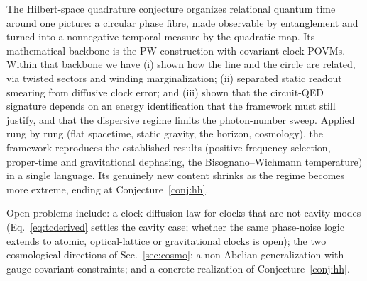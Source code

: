 \documentclass[aps,prd,onecolumn,notitlepage,10pt,amsmath,amssymb,amsfonts,nofootinbib]{revtex4-2}
\theoremstyle{definition}
\theoremstyle{remark}
\begin{document}
The Hilbert-space quadrature conjecture organizes relational quantum time around one picture: a circular phase fibre, made observable by entanglement and turned into a nonnegative temporal measure by the quadratic map. Its mathematical backbone is the PW construction with covariant clock POVMs. Within that backbone we have (i) shown how the line and the circle are related, via twisted sectors and winding marginalization; (ii) separated static readout smearing from diffusive clock error; and (iii) shown that the circuit-QED signature depends on an energy identification that the framework must still justify, and that the dispersive regime limits the photon-number sweep. Applied rung by rung (flat spacetime, static gravity, the horizon, cosmology), the framework reproduces the established results (positive-frequency selection, proper-time and gravitational dephasing, the Bisognano--Wichmann temperature) in a single language. Its genuinely new content shrinks as the regime becomes more extreme, ending at Conjecture~\ref{conj:hh}.

Open problems include: a clock-diffusion law for clocks that are not cavity modes (Eq.~\eqref{eq:tcderived} settles the cavity case; whether the same phase-noise logic extends to atomic, optical-lattice or gravitational clocks is open); the two cosmological directions of Sec.~\ref{sec:cosmo}; a non-Abelian generalization with gauge-covariant constraints; and a concrete realization of Conjecture~\ref{conj:hh}.

\appendix
\end{document}

